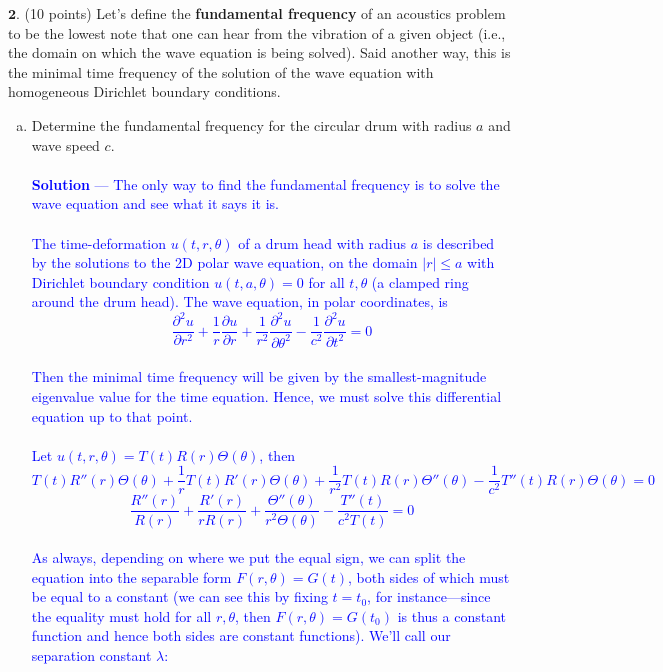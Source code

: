 \documentclass[12pt]{article}
\begin{document}
\vspace{0.3in}

\noindent $\textbf{2}$. (10 points) Let's define the \textbf{fundamental frequency} of an acoustics problem to be the lowest note that one can hear from the vibration of a given object (i.e., the domain on which the wave equation is being solved). Said another way, this is the minimal time frequency of the solution of the wave equation with homogeneous Dirichlet boundary conditions.
\begin{enumerate}[(a)]
\item Determine the fundamental frequency for the circular drum with radius $a$ and wave speed $c$. \\ \\  \textcolor{blue}{\textbf{Solution} — 
The only way to find the fundamental frequency is to solve the wave equation and see what it says it is. \\ \\ The time-deformation $u(t,r,\theta)$ of a drum head with radius $a$ is described by the solutions to the 2D polar wave equation, on the domain $|r| \leq a$ with Dirichlet boundary condition $u(t,a,\theta) = 0$ for all $t,\theta$ (a clamped ring around the drum head). The wave equation, in polar coordinates, is
$$\frac{\partial^2 u}{\partial r^2} + \frac{1}{r} \frac{\partial u}{\partial r} + \frac{1}{r^2} \frac{\partial^2 u}{\partial \theta ^2} - \frac{1}{c^2} \frac{\partial^2 u}{\partial t^2} = 0$$ \\
Then the minimal time frequency will be given by the smallest-magnitude eigenvalue value for the time equation. Hence, we must solve this differential equation up to that point. \\ \\
Let $u(t,r,\theta) = T(t)R(r)\Theta(\theta)$, then
$$T(t)R''(r)\Theta(\theta) + \frac{1}{r} T(t)R'(r)\Theta(\theta) + \frac{1}{r^2} T(t) R(r) \Theta''(\theta) - \frac{1}{c^2} T''(t)R(r) \Theta(\theta) = 0$$
$$\frac{R''(r)}{R(r)} + \frac{R'(r)}{r R(r)} + \frac{\Theta''(\theta)}{r^2 \Theta(\theta)}- \frac{T''(t) }{c^2 T(t)} = 0$$ \\
As always, depending on where we put the equal sign, we can split the equation into the separable form $F(r,\theta) = G(t)$, both sides of which must be equal to a constant (we can see this by fixing $t=t_0$, for instance—since the equality must hold for all $r,\theta$, then $F(r,\theta) = G(t_0)$ is thus a constant function and hence both sides are constant functions). We'll call our separation constant $\lambda$:
}
\end{enumerate}
\end{document}
